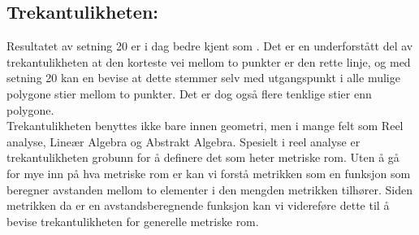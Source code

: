 \documentclass[12pt,
               a4paper,
               article,
               oneside,
               oldfontcommands,
               norsk]{memoir}
\begin{document}
\subsection{\large Trekantulikheten:}
Resultatet av setning 20 er i dag bedre kjent som . Det er en underforstått del av trekantulikheten at den korteste vei mellom to punkter er den rette linje, og med setning 20 kan en bevise at dette stemmer selv med utgangspunkt i alle mulige polygone stier mellom to punkter. Det er dog også flere tenklige stier enn polygone. \vspace{4mm}\\ 
Trekantulikheten benyttes ikke bare innen geometri, men i mange felt som Reel analyse, Lineær Algebra og Abstrakt Algebra. Spesielt i reel analyse er trekantulikheten grobunn for å definere det som heter metriske rom. Uten å gå for mye inn på hva metriske rom er kan vi forstå metrikken som en funksjon som beregner avstanden mellom to elementer i den mengden metrikken tilhører. Siden metrikken da er en avstandsberegnende funksjon kan vi videreføre dette til å bevise trekantulikheten for generelle metriske rom. \cite{t_ineq}
\end{document}
